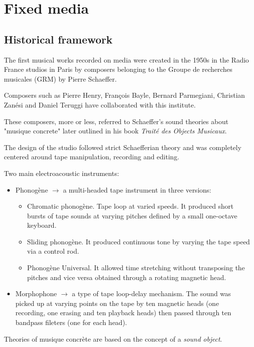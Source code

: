 \chapter{Fixed media}

\section{Historical framework}\label{historical-framework}

The first musical works recorded on media were created in the 1950s in the Radio France studios in Paris by composers belonging to the Groupe de recherches musicales (GRM) by Pierre Schaeffer.

Composers such as Pierre Henry, François Bayle, Bernard Parmegiani, Christian Zanési and Daniel Teruggi have collaborated with this institute.

These composers, more or less, referred to Schaeffer’s sound theories about "musique concrete" later outlined in his book  \textit{Traité des Objects Musicaux}.

The design of the studio followed strict Schaefferian theory and was completely centered around tape manipulation, recording and editing.

Two main electroacoustic instruments:

\begin{itemize}
\item Phonogène \(\rightarrow\) a multi-headed tape instrument in three versions:
    \begin{itemize}
    \tightlist
    \item Chromatic phonogène. Tape loop at varied speeds. It produced short bursts of tape sounds at varying pitches defined by a small one-octave keyboard.
    \item Sliding phonogène. It produced continuous tone by varying the tape speed via a control rod.
    \item Phonogène Universal. It allowed time stretching without transposing the pitches and vice versa obtained through a rotating magnetic head.
    \end{itemize}
\item Morphophone \(\rightarrow\)  a type of tape loop-delay mechanism. The sound was picked up at varying points on the tape by ten magnetic heads (one recording, one erasing and ten playback heads) then passed through ten bandpass fileters (one for each head).
\end{itemize}

Theories of musique concrète are based on the concept of a \textit{sound object}.

